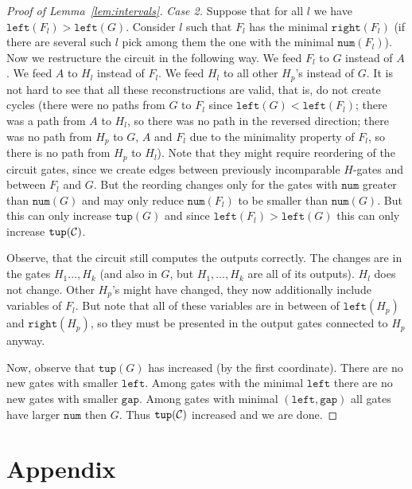 \documentclass[11pt,letterpaper]{article}
\newcommand{\lef}{\texttt{left}}
\newcommand{\righ}{\texttt{right}}
\newcommand{\gap}{\texttt{gap}}
\newcommand{\num}{\texttt{num}}
\newcommand{\tup}{\texttt{tup}}
\begin{document}
\begin{proof}[Proof of Lemma~\ref{lem:intervals}]
\emph{Case 2.} Suppose that for all $l$ we have $\lef(F_l)>\lef(G)$. Consider $l$ such that $F_l$ has the minimal $\righ(F_l)$ (if there are several such $l$ pick among them the one with the minimal $\num(F_l)$). Now we restructure the circuit in the following way. We feed $F_l$ to $G$ instead of $A$. We feed $A$ to $H_l$ instead of $F_l$. We feed $H_l$ to all other $H_p$'s instead of $G$. It is not hard to see that all these reconstructions are valid, that is, do not create cycles (there were no paths from $G$ to $F_l$ since $\lef(G)<\lef(F_l)$; there was a path from $A$ to $H_l$, so there was no path in the reversed direction; there was no path from $H_p$ to $G$, $A$ and $F_l$ due to the minimality property of $F_l$, so there is no path from $H_p$ to $H_l$). Note that they might require reordering of the circuit gates, since we create edges between previously incomparable $H$-gates and between $F_l$ and $G$. But the reording changes only for the gates with $\num$ greater than $\num(G)$ and may only reduce $\num(F_l)$ to be smaller than $\num(G)$. But this can only increase $\tup(G)$ and since $\lef(F_l)>\lef(G)$ this can only increase $\tup({\cal C})$.

Observe, that the circuit still computes the outputs correctly. The changes are in the gates $H_1\ldots, H_k$ (and also in $G$, but $H_1,\ldots, H_k$ are all of its outputs). $H_l$ does not change. Other $H_p$'s might have changed, they now additionally include variables of $F_l$. But note that all of these variables are in between of $\lef(H_p)$ and $\righ(H_p)$, so they must be presented in the output gates connected to $H_p$ anyway.

Now, observe that $\tup(G)$ has increased (by the first coordinate). There are no new gates with smaller $\lef$. Among gates with the minimal $\lef$ there are no new gates with smaller $\gap$. Among gates with minimal $(\lef,\gap)$ all gates have larger $\num$ then $G$. Thus $\tup({\cal C})$ increased and we are done.
\end{proof}






\section{Appendix}



\end{document}
